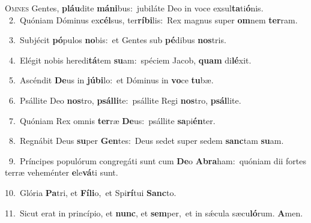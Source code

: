 \lettrine{\initial\textcolor{\initialcolor}{O}}{mnes} Gentes, \textbf{pláu}\-dite \textbf{má}\-\textbf{ni}bus:~\star jubiláte Deo in voce exsul\-\textbf{ta}\-ti\-\textbf{ó}\-nis.\\
{\numbfont\textcolor{\numbcolor}{~2.}}~Quóniam Dóminus ex\-\textbf{cél}\-sus, ter\-\textbf{rí}\-\textbf{bi}lis:~\star Rex magnus super \textbf{om}\-nem \textbf{ter}\-ram.\par
{\numbfont\textcolor{\numbcolor}{~3.}}~Subjécit \textbf{pó}\-pulos \textbf{no}\-bis:~\star et Gentes sub \textbf{pé}\-dibus \textbf{nos}\-tris.\par
{\numbfont\textcolor{\numbcolor}{~4.}}~Elégit nobis heredi\-\textbf{tá}\-tem \textbf{su}\-am:~\star spéciem Jacob, \textbf{quam} di\-\textbf{lé}\-xit.\par
{\numbfont\textcolor{\numbcolor}{~5.}}~Ascéndit \textbf{De}\-us in \textbf{jú}\-\textbf{bi}lo:~\star et Dóminus in \textbf{vo}\-ce \textbf{tu}\-bæ.\par
{\numbfont\textcolor{\numbcolor}{~6.}}~Psállite Deo \textbf{nos}\-tro, \textbf{psál}\-\textbf{li}te:~\star psállite Regi \textbf{nos}\-tro, \textbf{psál}\-lite.\par
{\numbfont\textcolor{\numbcolor}{~7.}}~Quóniam Rex omnis \textbf{ter}\-ræ \textbf{De}\-us:~\star psállite \textbf{sa}\-pi\-\textbf{én}\-ter.\par
{\numbfont\textcolor{\numbcolor}{~8.}}~Regnábit Deus \textbf{su}\-per \textbf{Gen}\-tes:~\star Deus sedet super sedem \textbf{sanc}\-tam \textbf{su}\-am.\par
{\numbfont\textcolor{\numbcolor}{~9.}}~Príncipes populórum congregáti sunt cum \textbf{De}\-o \textbf{A}\-\textbf{bra}ham:~\star quóniam dii fortes terræ veheménter \textbf{e}\-le\-\textbf{vá}\-ti sunt.\par
{\numbfont\textcolor{\numbcolor}{10.}}~Glória \textbf{Pa}\-tri, et \textbf{Fí}\-\textbf{li}o,~\star et Spi\-\textbf{rí}\-tui \textbf{Sanc}\-to.\par
{\numbfont\textcolor{\numbcolor}{11.}}~Sicut erat in princípio, et \textbf{nunc}\-, et \textbf{sem}\-per,~\star et in sǽcula sæcu\-\textbf{ló}\-rum. \textbf{A}\-men.\par

